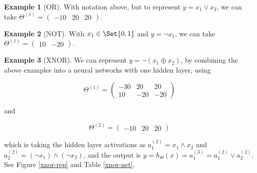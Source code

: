 \documentclass[a4paper,12pt]{article}
\theoremstyle{definition}
\newtheorem*{ex}{Example}
\begin{document}
\begin{ex}[OR]
With notation above, but to represent $y = x_1 \lor x_2$, we can take $\Theta^{(1)} = \begin{pmatrix} -10 & 20 & 20 \end{pmatrix}$.
\end{ex}

\begin{ex}[NOT]
With $x_1 \in \Set{0, 1}$ and $y = \lnot x_1$, we can take $\Theta^{(1)} = \begin{pmatrix} 10 & -20 \end{pmatrix}$.
\end{ex}

\begin{ex}[XNOR]
We can represent $y = \lnot (x_1 \oplus x_2)$, by combining the above examples into a neural networks with one hidden layer, using

\[
\Theta^{(1)} = \begin{pmatrix} -30 & 20 & 20 \\ 10 & -20 & -20\end{pmatrix}
\]

and

\[
\Theta^{(2)} = \begin{pmatrix} -10 & 20 & 20\end{pmatrix}
\]

which is taking the hidden layer activations as $a_1^{(2)} = x_1 \land x_2$ and $a_2^{(2)} = (\lnot x_1) \land (\lnot x_2)$, and the output is $y = h_{\Theta}(x) = a_1^{(3)} = a_1^{(2)} \lor a_2^{(2)}$. See Figure \ref{xnor-rep} and Table \ref{xnor-net}.
\end{ex}
\end{document}
